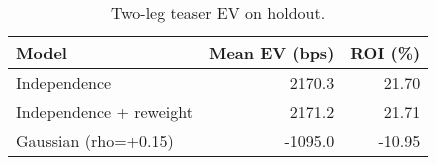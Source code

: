 \begin{table}[t]
  \centering
  \small
  \caption{Two-leg teaser EV on holdout.}
  \begin{tabular}{lrr}
    \toprule
 \textbf{Model} & \textbf{Mean EV (bps)} & \textbf{ROI (\%)} \\
    \midrule
    Independence & 2170.3 & 21.70 \\
    Independence + reweight & 2171.2 & 21.71 \\
    Gaussian (rho=+0.15) & -1095.0 & -10.95 \\
    \bottomrule
  \end{tabular}
\end{table}
